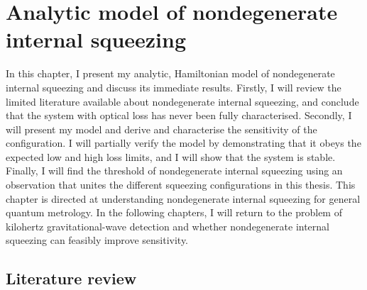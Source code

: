 \chapter{Analytic model of nondegenerate internal squeezing} %
\label{chp:nIS_analytics}





In this chapter, I present my analytic, Hamiltonian model of nondegenerate internal squeezing and discuss its immediate results.
Firstly, I will review the limited literature available about nondegenerate internal squeezing, and conclude that the system with optical loss has never been fully characterised. Secondly, I will present my model and derive and characterise the sensitivity of the configuration. I will partially verify the model by demonstrating that it obeys the expected low and high loss limits, and I will show that the system is stable. Finally, I will find the threshold of nondegenerate internal squeezing using an observation that unites the different squeezing configurations in this thesis. 
This chapter is directed at understanding nondegenerate internal squeezing for general quantum metrology. In the following chapters, I will return to the problem of kilohertz gravitational-wave detection and whether nondegenerate internal squeezing can feasibly improve sensitivity. 


\section{Literature review}

